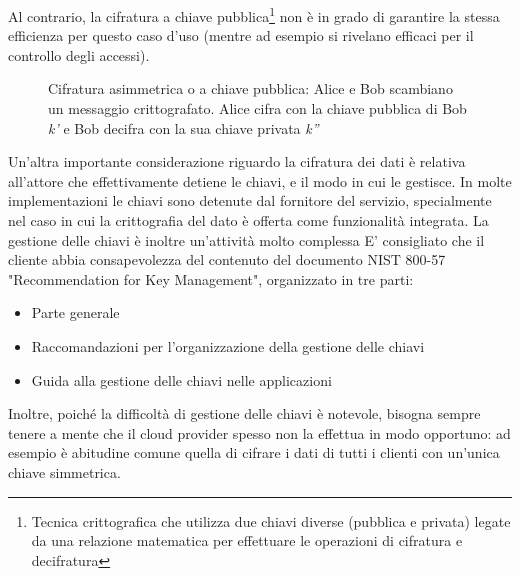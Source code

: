 Al contrario, la cifratura a chiave pubblica\footnote{Tecnica crittografica che utilizza due chiavi diverse (pubblica e privata) legate da una relazione matematica per effettuare le operazioni di cifratura e decifratura} non è in grado di garantire la stessa efficienza per questo caso d'uso\cite{CloudSecurityBook} (mentre ad esempio si rivelano efficaci per il controllo degli accessi).

\begin{figure}[H]
\centering
{}
\caption{Cifratura asimmetrica o a chiave pubblica: Alice e Bob scambiano un messaggio crittografato. Alice cifra con la chiave pubblica di Bob \textit{k'} e Bob decifra con la sua chiave privata \textit{k''}}\label{fig:cifraturaasimmetrica}
\end{figure}

Un'altra importante considerazione riguardo la cifratura dei dati è relativa all'attore che effettivamente detiene le chiavi, e il modo in cui le gestisce. In molte implementazioni le chiavi sono detenute dal fornitore del servizio, specialmente nel caso in cui la crittografia del dato è offerta come funzionalità integrata.
La gestione delle chiavi è inoltre un'attività molto complessa
E' consigliato che il cliente abbia consapevolezza del contenuto del documento NIST 800-57 "Recommendation for Key Management"\cite{NISTKeys}, organizzato in tre parti:\cite{CloudSecurityBook}
\begin{itemize}
\item Parte generale
\item Raccomandazioni per l'organizzazione della gestione delle chiavi
\item Guida alla gestione delle chiavi nelle applicazioni
\end{itemize}
Inoltre, poiché la difficoltà di gestione delle chiavi è notevole, bisogna sempre tenere a mente che il cloud provider spesso non la effettua in modo opportuno: ad esempio è abitudine comune quella di cifrare i dati di tutti i clienti con un'unica chiave simmetrica.

